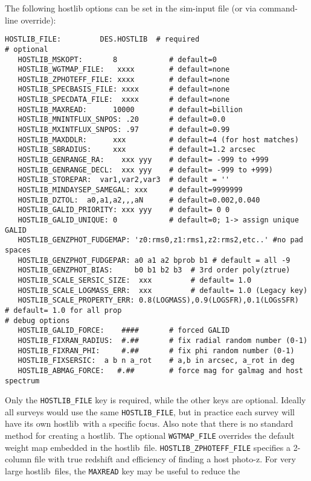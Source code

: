 \documentclass[12pt]{article}
\newcommand{\hostlib}{{\sc hostlib}}
\begin{document}
{The following {\hostlib} options can be set in
the sim-input file (or via command-line override):
%
\begin{Verbatim}[frame=single]
   HOSTLIB_FILE:         DES.HOSTLIB  # required
# optional
   HOSTLIB_MSKOPT:       8            # default=0
   HOSTLIB_WGTMAP_FILE:   xxxx        # default=none
   HOSTLIB_ZPHOTEFF_FILE: xxxx        # default=none
   HOSTLIB_SPECBASIS_FILE: xxxx       # default=none
   HOSTLIB_SPECDATA_FILE:  xxxx       # default=none
   HOSTLIB_MAXREAD:      10000        # default=billion
   HOSTLIB_MNINTFLUX_SNPOS: .20       # default=0.0
   HOSTLIB_MXINTFLUX_SNPOS: .97       # default=0.99
   HOSTLIB_MAXDDLR:      xxx          # default=4 (for host matches)
   HOSTLIB_SBRADIUS:     xxx          # default=1.2 arcsec
   HOSTLIB_GENRANGE_RA:    xxx yyy    # default= -999 to +999
   HOSTLIB_GENRANGE_DECL:  xxx yyy    # default= -999 to +999)   
   HOSTLIB_STOREPAR:  var1,var2,var3  # default = ''
   HOSTLIB_MINDAYSEP_SAMEGAL: xxx     # default=9999999
   HOSTLIB_DZTOL:  a0,a1,a2,,,aN      # default=0.002,0.040
   HOSTLIB_GALID_PRIORITY: xxx yyy    # default= 0 0 
   HOSTLIB_GALID_UNIQUE: 0            # default=0; 1-> assign unique GALID
   HOSTLIB_GENZPHOT_FUDGEMAP: 'z0:rms0,z1:rms1,z2:rms2,etc..' #no pad spaces
   HOSTLIB_GENZPHOT_FUDGEPAR: a0 a1 a2 bprob b1 # default = all -9
   HOSTLIB_GENZPHOT_BIAS:     b0 b1 b2 b3  # 3rd order poly(ztrue)
   HOSTLIB_SCALE_SERSIC_SIZE:  xxx         # default= 1.0
   HOSTLIB_SCALE_LOGMASS_ERR:  xxx         # default= 1.0 (Legacy key)
   HOSTLIB_SCALE_PROPERTY_ERR: 0.8(LOGMASS),0.9(LOGSFR),0.1(LOGsSFR)   # default= 1.0 for all prop
# debug options
   HOSTLIB_GALID_FORCE:    ####       # forced GALID 
   HOSTLIB_FIXRAN_RADIUS:  #.##       # fix radial random number (0-1)
   HOSTLIB_FIXRAN_PHI:     #.##       # fix phi random number (0-1)
   HOSTLIB_FIXSERSIC:  a b n a_rot    # a,b in arcsec, a_rot in deg
   HOSTLIB_ABMAG_FORCE:   #.##        # force mag for galmag and host spectrum
\end{Verbatim}
Only the {\tt HOSTLIB\_FILE} key is required, while the
other keys are optional. Ideally all surveys would use
the same {\tt HOSTLIB\_FILE}, but in practice each survey
will have its own \hostlib\ with a specific focus.
Also note that there is no standard method for creating 
a \hostlib. The optional {\tt WGTMAP\_FILE} overrides the 
default weight map embedded in the
\hostlib\ file. 
{\tt HOSTLIB\_ZPHOTEFF\_FILE} specifies a 2-column file with
true redshift and efficiency of finding a host photo-z.
For very large \hostlib\ files,
the {\tt MAXREAD} key may be useful to reduce the 
}
\end{document}
